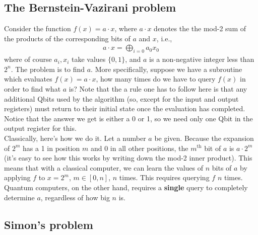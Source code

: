 \documentclass{book}
\theoremstyle{definition}
\begin{document}
\subsection{The Bernstein-Vazirani problem}

Consider the function $f(x) = a \cdot x$, where $a\cdot x$ denotes the the mod-2 sum of the products of the corresponding bits of $a$ and $x$, i.e., 
\begin{align}
a\cdot x = \bigoplus_{i=0} a_0 x_0
\end{align}
where of course $a_i, x_i$ take values $\{ 0,1\}$, and $a$ is a non-negative integer less than $2^n$. The problem is to find $a$. More specifically, suppose we have a subroutine which evaluates $f(x) = a\cdot x$, how many times do we have to query $f(x)$ in order to find what $a$ is? Note that the a rule one has to follow here is that any additional Qbits used by the algorithm (so, except for the input and output registers) must return to their initial state once the evaluation has completed. Notice that the answer we get is either a 0 or 1, so we need only one Qbit in the output register for this.  \\

Classically, here's how we do it. Let a number $a$ be given. Because the expansion of $2^m$ has a 1 in position $m$ and 0 in all other positions, the $m^{\text{th}}$ bit of $a$ is $a\cdot 2^m$ (it's easy to see how this works by writing down the mod-2 inner product).  This means that with a classical computer, we can learn the values of $n$ bits of $a$ by applying $f$ to $x = 2^m$, $m \in [0,n]$, $n$ times.  This requires querying $f$ $n$ times. \\

Quantum computers, on the other hand, requires a \textbf{single} query to completely determine $a$, regardless of how big $n$ is. 






























\subsection{Simon's problem}
\end{document}
